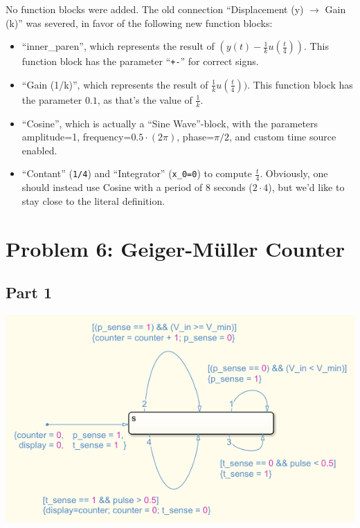 \documentclass[a4paper,parskip,headheight=38pt]{scrartcl} %
\begin{document}
No function blocks were added.  The old connection
\enquote{Displacement (y) $\rightarrow$ Gain (k)} was severed, in favor
of the following new function blocks:
\begin{itemize}
    \item \enquote{inner\_paren}, which represents the result of $(y(t)
    - \frac{1}{k}u(\frac{t}{4}))$.  This function block has the parameter
    \enquote{\texttt{+-}} for correct signs.
    \item \enquote{Gain (1/k)}, which represents the result of
    $\frac{1}{k}u(\frac{t}{4}))$.  This function block has the parameter $0.1$,
    as that's the value of $\frac{1}{k}$.
    \item \enquote{Cosine}, which is actually a \enquote{Sine
    Wave}-block, with the parameters amplitude=1,
    frequency=$0.5 \cdot (2\pi)$, phase=$\pi/2$,
    and custom time source enabled.
    \item \enquote{Contant} (\texttt{1/4}) and \enquote{Integrator}
    (\texttt{x\_0=0}) to compute $\frac{t}{4}$.  Obviously, one should
    instead use Cosine with a period of 8 seconds ($2 \cdot 4$), but
    we'd like to stay close to the literal definition.
\end{itemize}


\section*{Problem 6: Geiger-Müller Counter}

\subsection*{Part 1}

\includegraphics[width=\textwidth]{p6a-model}
\end{document}

